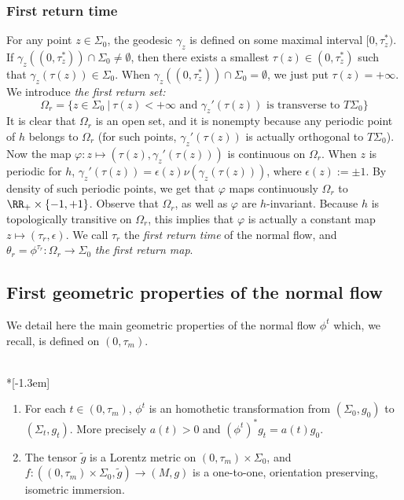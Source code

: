 \subsubsection{First return time}\label{sec.first}
For any point $z \in \Sigma_0$, the geodesic $\gamma_z$ is defined on some maximal interval $[0,\tau_z^*)$. If $\gamma_z((0,\tau_z^*)) \cap \Sigma_0 \not = \emptyset$, then there exists a smallest $\tau(z) \in (0,\tau_z^*)$ such that $\gamma_z(\tau(z)) \in \Sigma_0$. When $\gamma_z((0,\tau_z^*)) \cap \Sigma_0 = \emptyset$, we just put $\tau(z)=+ \infty$. We introduce \emph{the first return set:}
\[
\Omega_r= \{ z \in \Sigma_0\ | \ \tau(z)<+ \infty \text{ and } \gamma_z'(\tau(z)) \text{ is transverse to }T\Sigma_0 \}
\]
It is clear that $\Omega_r$ is an open set, and it is nonempty because any periodic point of $h$ belongs to $\Omega_r$ (for such points, $\gamma_z'(\tau(z))$ is actually orthogonal to $T\Sigma_0$). Now the map $\varphi: z \mapsto (\tau(z), \gamma_z'(\tau(z)))$ is continuous on $\Omega_r$. When $z$ is periodic for $h$, $\gamma_z'(\tau(z))=\epsilon(z) \nu(\gamma_z(\tau(z)))$, where $\epsilon(z):=\pm 1$. By density of such periodic points, we get that $\varphi$ maps continuously $\Omega_r$ to $\RR_+ \times \{-1,+1\}$. Observe that $\Omega_r$, as well as $\varphi$ are $h$-invariant. Because $h$ is topologically transitive on $\Omega_r$, this implies that $\varphi$ is actually a constant map $z \mapsto (\tau_r,\epsilon)$. We call $\tau_r$ the \emph{first return time} of the normal flow, and $\theta_r=\phi^{\tau_r}: \Omega_r \to \Sigma_0$ \emph{the first return map}.



\subsection{First geometric properties of the normal flow}\label{sec.geometric.properties}
We detail here the main geometric properties of the normal flow $\phi^t$ which, we recall, is defined on $(0,\tau_m)$.


\begin{prop}\label{fact.lorentz}\ \\*[-1.3em]
\begin{enumerate}
\item \label{5.5.1}For each $t \in (0,\tau_m)$, $\phi^t$ is an homothetic transformation from $(\Sigma_0,g_0)$ to $(\Sigma_t,g_t)$. More precisely $a(t)>0$ and $(\phi^t)^*g_t=a(t)g_0$.
\item \label{5.5.2}The tensor $\tilde{g}$ is a Lorentz metric on $(0,\tau_m) \times \Sigma_0$, and $f: ((0,\tau_m) \times \Sigma_0, \tilde{g}) \to (M,g)$ is a one-to-one, orientation preserving, isometric immersion.
\end{enumerate}
\end{prop}


